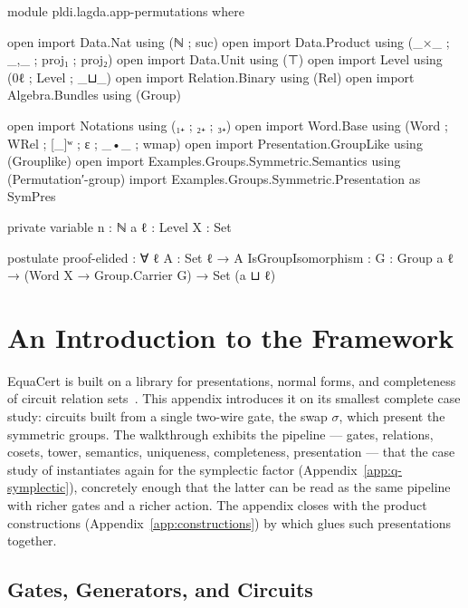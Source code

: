 \begin{code}[hide]
module pldi.lagda.app-permutations where

open import Data.Nat using (ℕ ; suc)
open import Data.Product using (_×_ ; _,_ ; proj₁ ; proj₂)
open import Data.Unit using (⊤)
open import Level using (0ℓ ; Level ; _⊔_)
open import Relation.Binary using (Rel)
open import Algebra.Bundles using (Group)

open import Notations using (₁₊ ; ₂₊ ; ₃₊)
open import Word.Base using (Word ; WRel ; [_]ʷ ; ε ; _•_ ; wmap)
open import Presentation.GroupLike using (Grouplike)
open import Examples.Groups.Symmetric.Semantics using (Permutation′-group)
import Examples.Groups.Symmetric.Presentation as SymPres

private variable
  n : ℕ
  a ℓ : Level
  X : Set

postulate
  proof-elided : ∀ {ℓ} {A : Set ℓ} → A
  IsGroupIsomorphism : {G : Group a ℓ} → (Word X → Group.Carrier G) → Set (a ⊔ ℓ)
\end{code}
\section{An Introduction to the Framework}\label{app:permutations}

EquaCert is built on a library for presentations, normal forms, and
completeness of circuit relation sets~\cite{bian2027popl}.  This
appendix introduces it on its smallest complete case study: circuits
built from a single two-wire gate, the swap $\sigma$, which present the
symmetric groups.  The walkthrough exhibits the pipeline --- gates,
relations, cosets, tower, semantics, uniqueness, completeness,
presentation --- that the case study of 
instantiates again for the symplectic factor
(Appendix~\ref{app:q-symplectic}), concretely enough that the latter can
be read as the same pipeline with richer gates and a richer action.  The
appendix closes with the product constructions
(Appendix~\ref{app:constructions}) by which  glues
such presentations together.

\subsection{Gates, Generators, and Circuits}\label{app:sn-gates}

